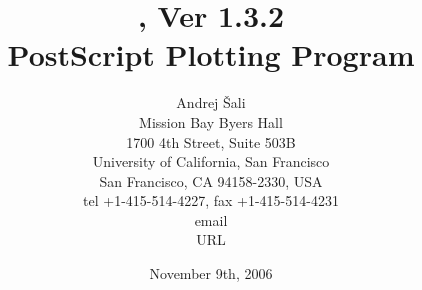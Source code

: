 \title{\vspace{3cm} \ASGL, Ver 1.3.2 \\[1cm]
       PostScript Plotting Program \\[3cm]}

\author{Andrej \v{S}ali \\[0.5cm]
Mission Bay Byers Hall \\
1700 4th Street, Suite 503B \\
University of California, San Francisco \\
San Francisco, CA 94158-2330, USA \\
tel +1-415-514-4227, fax +1-415-514-4231  \\
email  \\
URL 
}

\date{November 9th, 2006}
